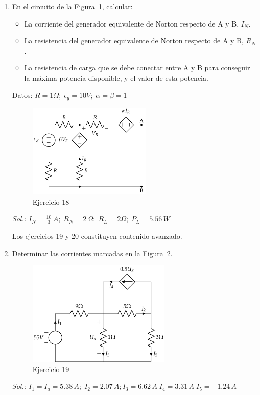 \begin{enumerate}
\item En el circuito de la Figura~\ref{fig.norton_ej}, calcular:
\begin{itemize}
\item La corriente del generador equivalente de Norton respecto de A y B, $I_N$.
\item La resistencia del generador equivalente de Norton respecto de A y B, $R_N$.
\item La resistencia de carga que se debe conectar entre A y B para conseguir la máxima potencia disponible, y el valor de esta potencia.
\end{itemize}

Datos: $R = {1}{\Omega};\; \epsilon_g = {10}{V};\; \alpha = \beta = 1$

\begin{figure}[H]
    \centering
    \includegraphics[height=4.5cm]{../figs/norton.pdf}
    \caption{Ejercicio 18}
    \label{fig.norton_ej}
\end{figure}

\emph{Sol.: $I_N=\frac{10}{3}\,A;\; R_N=2\,\Omega;\; R_L=2\Omega;\; P_L=5.56\,W$}


\begin{remark}
    Los ejercicios 19 y 20 constituyen contenido avanzado.
\end{remark}

\item Determinar las corrientes marcadas en la Figura~\ref{fig.ej13_BT1}.
\begin{figure}[H]
    \centering
    \includegraphics[height=5cm]{../figs/ej13_BT1.pdf}
    \caption{Ejercicio 19}
    \label{fig.ej13_BT1}
\end{figure}
\emph{Sol.: $I_1=I_a=5.38\,A;\;I_2=2.07\,A; I_3=6.62\,A\; I_4=3.31\,A\;     I_5=-1.24\,A$}


\end{enumerate}
